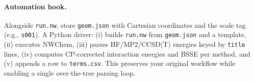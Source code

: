 \paragraph{Automation hook.}
Alongside \texttt{run.nw}, store \texttt{geom.json} with Cartesian coordinates and the scale tag (e.g., \texttt{s001}).
A Python driver:
(i) builds \texttt{run.nw} from \texttt{geom.json} and a template,
(ii) executes NWChem,
(iii) parses HF/MP2/CCSD(T) energies keyed by \texttt{title} lines,
(iv) computes CP-corrected interaction energies and BSSE per method, and
(v) appends a row to \texttt{terms.csv}.
This preserves your original workflow while enabling a single over-the-tree parsing loop.
